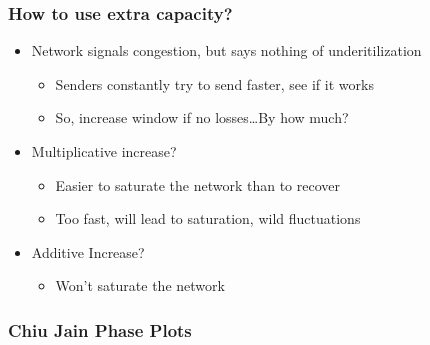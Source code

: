 \subsubsection{How to use extra capacity?}
\begin{itemize}[nosep]
    \item Network signals congestion, but says nothing of underitilization
          \begin{itemize}[nosep]
              \item Senders constantly try to send faster, see if it works
              \item So, increase window if no losses\dots By how much?
          \end{itemize}
    \item Multiplicative increase?
          \begin{itemize}[nosep]
              \item Easier to saturate the network than to recover
              \item Too fast, will lead to saturation, wild fluctuations
          \end{itemize}
    \item Additive Increase?
          \begin{itemize}[nosep]
              \item Won't saturate the network
          \end{itemize}
\end{itemize}

\subsubsection{Chiu Jain Phase Plots}
\begin{figure}[H]
\end{figure}

